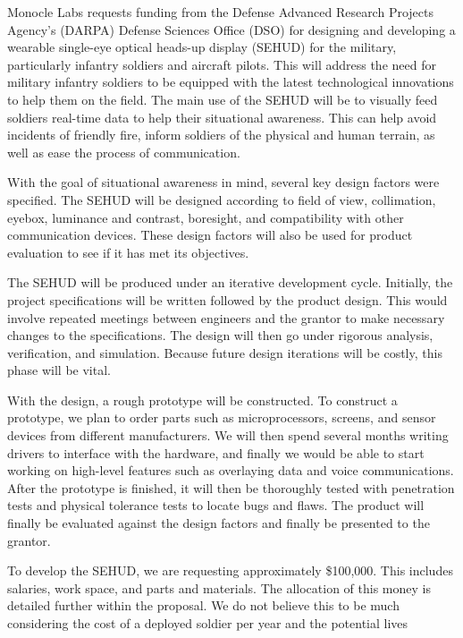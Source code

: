 Monocle Labs requests funding from the Defense Advanced Research Projects
Agency's (DARPA) Defense Sciences Office (DSO) for designing and developing a
wearable single-eye optical heads-up display (SEHUD) for the military,
particularly infantry soldiers and aircraft pilots. This will address the need
for military infantry soldiers to be equipped with the latest technological
innovations to help them on the field. The main use of the SEHUD will be to
visually feed soldiers real-time data to help their situational awareness. This
can help avoid incidents of friendly fire, inform soldiers of the physical and
human terrain, as well as ease the process of communication.

With the goal of situational awareness in mind, several key design factors
were specified. The SEHUD will be designed according to field of view,
collimation, eyebox, luminance and contrast, boresight, and compatibility
with other communication devices. These design factors will also be used for
product evaluation to see if it has met its objectives.

The SEHUD will be produced under an iterative development cycle. Initially, the
project specifications will be written followed by the product design. This
would involve repeated meetings between engineers and the grantor to make
necessary changes to the specifications. The design will then go under rigorous
analysis, verification, and simulation. Because future design iterations will
be costly, this phase will be vital.

With the design, a rough prototype will be constructed. To construct a
prototype, we plan to order parts such as microprocessors, screens, and sensor
devices from different manufacturers. We will then spend several months writing
drivers to interface with the hardware, and finally we would be able to start
working on high-level features such as overlaying data and voice
communications. After the prototype is finished, it will then be thoroughly
tested with penetration tests and physical tolerance tests to locate bugs and
flaws. The product will finally be evaluated against the design factors and
finally be presented to the grantor.

To develop the SEHUD, we are requesting approximately \$100,000. This includes
salaries, work space, and parts and materials. The allocation of this money is
detailed further within the proposal. We do not believe this to be much
considering the cost of a deployed soldier per year and the potential lives

